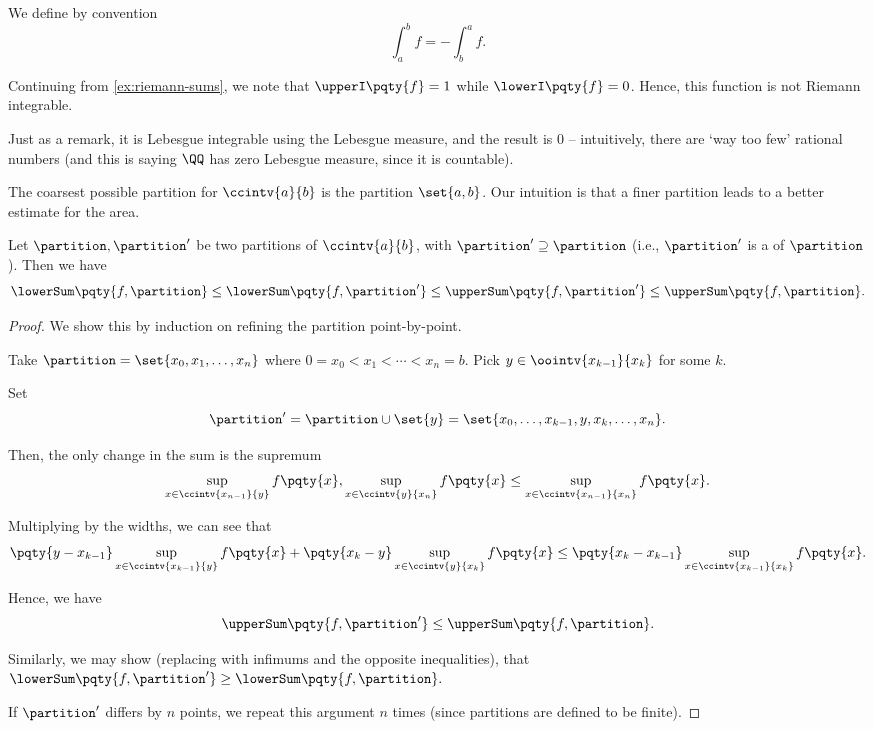 \begin{remark}
    We define by convention
    \[
        \int_{a}^{b} f = - \int_{b}^{a} f.
    \]
\end{remark}

\begin{example}
    \label{ex:non-riemann-integrable-fn}%
    Continuing from \autoref{ex:riemann-sums}, we note that \(\upperI\pqty{f} = 1\) while \(\lowerI\pqty{f} = 0\). Hence, this function is not Riemann integrable.
    
    Just as a remark, it is Lebesgue integrable using the Lebesgue measure, and the result is \(0\) -- intuitively, there are `way too few' rational numbers (and this is saying \(\QQ\) has zero Lebesgue measure, since it is countable).
\end{example}

The coarsest possible partition for \(\ccintv{a}{b}\) is the partition \(\set{a, b}\). Our intuition is that a finer partition leads to a better estimate for the area.

\begin{lemma}
    \label{lem:refinement-better-estimate}%
    Let \(\partition, \partition'\) be two partitions of \(\ccintv{a}{b}\), with \(\partition' \supseteq \partition\) (i.e., \(\partition'\) is a  of \(\partition\)). Then we have
    \[
        \lowerSum\pqty{f, \partition} \leq \lowerSum\pqty{f, \partition'} \leq \upperSum\pqty{f, \partition'} \leq \upperSum\pqty{f, \partition}.
    \]
\end{lemma}

\begin{proof}
    We show this by induction on refining the partition point-by-point.
    
    Take \(\partition = \set{x_0, x_1, \ldots, x_n}\) where \(0 = x_0 < x_1 < \cdots < x_n = b\). Pick \(y \in \oointv{x_{k - 1}}{x_k}\) for some \(k\).

    Set
    \[
        \partition' = \partition \cup \set{y} = \set{x_0, \ldots, x_{k - 1}, y, x_k, \ldots, x_n}.
    \]

    Then, the only change in the sum is the supremum
    \[
        \sup_{x \in \ccintv{x_{n - 1}}{y}} f\pqty{x}, \sup_{x \in \ccintv{y}{x_n}} f\pqty{x} \leq \sup_{x \in \ccintv{x_{n - 1}}{x_n}} f\pqty{x}.
    \]

    Multiplying by the widths, we can see that
    \[
        \pqty{y - x_{k - 1}} \sup_{x \in \ccintv{x_{k - 1}}{y}} f\pqty{x} + \pqty{x_k - y} \sup_{x \in \ccintv{y}{x_k}} f\pqty{x} \leq \pqty{x_k - x_{k - 1}} \sup_{x \in \ccintv{x_{k - 1}}{x_k}} f\pqty{x}.
    \]

    Hence, we have
    \[
        \upperSum\pqty{f, \partition'} \leq \upperSum \pqty{f, \partition}.
    \]

    Similarly, we may show (replacing with infimums and the opposite inequalities), that
    \(
        \lowerSum\pqty{f, \partition'} \geq \lowerSum \pqty{f, \partition}.
    \)

    If \(\partition'\) differs by \(n\) points, we repeat this argument \(n\) times (since partitions are defined to be finite).
\end{proof}

